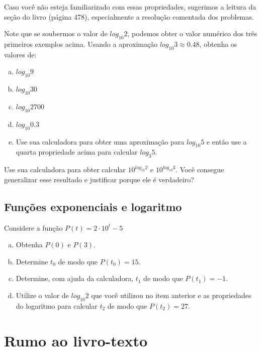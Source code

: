 \documentclass[main_estudante.tex]{subfiles}
\begin{document}
Caso você não esteja familiarizado com essas propriedades, sugerimos a leitura da seção  do livro  (página 478), especialmente a resolução comentada dos problemas.

\begin{questao}
Note que se soubermos o valor de $log_{10} 2$, podemos obter o valor numérico dos três primeiros exemplos acima. Usando a aproximação $log_{10} 3 \approx 0.48$, obtenha os valores de:
\begin{enumerate}[a)]
\item $log_{10} 9$
\item $log_{10} 30$
\item $log_{10} 2700$
\item $log_{10} 0.3$
\item Use sua calculadora para obter uma aproximação para $log_{10} 5$ e então use a quarta propriedade acima para calcular $log_{3} 5$.
\end{enumerate}
\end{questao}

\begin{reflita}
 Use sua calculadora para obter calcular $10^{log_{10} 2}$ e $10^{log_{10} 3}$. Você consegue generalizar esse resultado e justificar porque ele é verdadeiro?
\end{reflita}


\subsection*{Funções exponenciais e logaritmo}

\begin{questao}
Considere a função $P(t)=2 \cdot 10^t - 5$
\begin{enumerate}[a)]
\item Obtenha $P(0)$ e $P(3)$.
\item Determine $t_0$ de modo que $P(t_0)=15$.
\item Determine, com ajuda da calculadora, $t_1$ de modo que $P(t_1)=-1$.
\item Utilize o valor de $log_{10} 2$ que você utilizou no item anterior e as propriedades do logaritmo para calcular $t_2$ de modo que $P(t_2)=27$.
\end{enumerate}
\end{questao}

\section{Rumo ao livro-texto}
\end{document}
